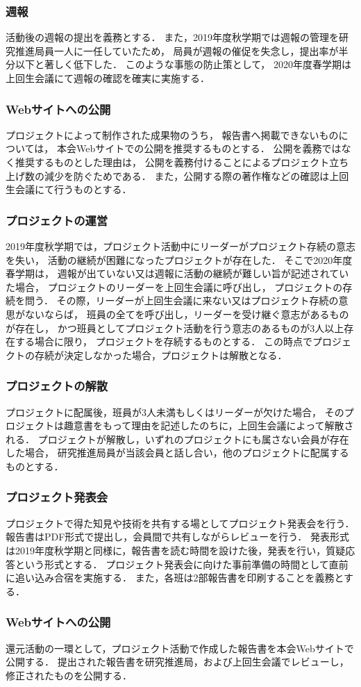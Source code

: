 \subsubsection*{週報}
活動後の週報の提出を義務とする．
また，2019年度秋学期では週報の管理を研究推進局員一人に一任していたため，
局員が週報の催促を失念し，提出率が半分以下と著しく低下した．
このような事態の防止策として，
2020年度春学期は上回生会議にて週報の確認を確実に実施する．

\subsubsection*{Webサイトへの公開}
プロジェクトによって制作された成果物のうち，
報告書へ掲載できないものについては，
本会Webサイトでの公開を推奨するものとする．
公開を義務ではなく推奨するものとした理由は，
公開を義務付けることによるプロジェクト立ち上げ数の減少を防ぐためである．
また，公開する際の著作権などの確認は上回生会議にて行うものとする．


\subsubsection*{プロジェクトの運営}
2019年度秋学期では，プロジェクト活動中にリーダーがプロジェクト存続の意志を失い，
活動の継続が困難になったプロジェクトが存在した．
そこで2020年度春学期は，
週報が出ていない又は週報に活動の継続が難しい旨が記述されていた場合，
プロジェクトのリーダーを上回生会議に呼び出し，
プロジェクトの存続を問う．
その際，リーダーが上回生会議に来ない又はプロジェクト存続の意思がないならば，
班員の全てを呼び出し，リーダーを受け継ぐ意志があるものが存在し，
かつ班員としてプロジェクト活動を行う意志のあるものが3人以上存在する場合に限り，
プロジェクトを存続するものとする．
この時点でプロジェクトの存続が決定しなかった場合，プロジェクトは解散となる．

\subsubsection*{プロジェクトの解散}
プロジェクトに配属後，班員が3人未満もしくはリーダーが欠けた場合，
そのプロジェクトは趣意書をもって理由を記述したのちに，上回生会議によって解散される．
プロジェクトが解散し，いずれのプロジェクトにも属さない会員が存在した場合，
研究推進局員が当該会員と話し合い，他のプロジェクトに配属するものとする．

\subsubsection*{プロジェクト発表会}
プロジェクトで得た知見や技術を共有する場としてプロジェクト発表会を行う．
報告書はPDF形式で提出し，会員間で共有しながらレビューを行う．
発表形式は2019年度秋学期と同様に，報告書を読む時間を設けた後，発表を行い，質疑応答という形式とする．
プロジェクト発表会に向けた事前準備の時間として直前に追い込み合宿を実施する．
また，各班は2部報告書を印刷することを義務とする．

\subsubsection*{Webサイトへの公開}
還元活動の一環として，プロジェクト活動で作成した報告書を本会Webサイトで公開する．
提出された報告書を研究推進局，および上回生会議でレビューし，修正されたものを公開する．
